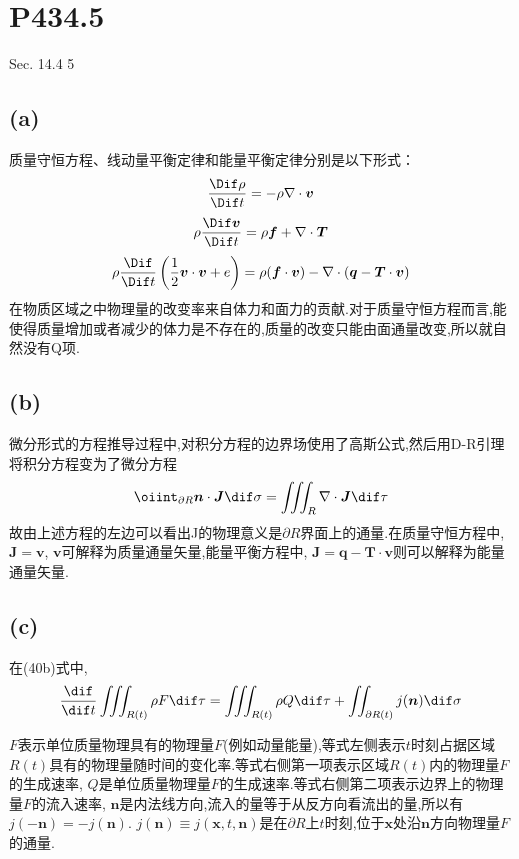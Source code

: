 \documentclass[12pt]{article}
\begin{document}
\section{P434.5}

Sec. 14.4 5

\subsection{(a)}

质量守恒方程、线动量平衡定律和能量平衡定律分别是以下形式：
\begin{equation}
	\frac{\Dif \rho}{\Dif t} = -\rho\nabla\cdot \bm{v}
\end{equation}
\begin{equation}
	\rho\frac{\Dif \bm{v}}{\Dif t} = \rho \bm{f} + \nabla\cdot \bm{T}
\end{equation}
\begin{equation}
	\rho\frac{\Dif }{\Dif t}\left(\frac{1}{2}\bm{v}\cdot \bm{v}+e\right) = \rho(\bm{f}\cdot \bm{v})-\nabla\cdot(\bm{q}-\bm{T}\cdot \bm{v})
\end{equation}
在物质区域之中物理量的改变率来自体力和面力的贡献.对于质量守恒方程而言,能使得质量增加或者减少的体力是不存在的,质量的改变只能由面通量改变,所以就自然没有Q项.

\subsection{(b)}

微分形式的方程推导过程中,对积分方程的边界场使用了高斯公式,然后用D-R引理将积分方程变为了微分方程
\begin{equation}
	\oiint_{\partial R}\bm{n}\cdot \bm{J} \dif \sigma = \iiint_{R}\nabla\cdot \bm{J}\dif \tau
\end{equation}
故由上述方程的左边可以看出J的物理意义是$\partial R$界面上的通量.在质量守恒方程中, $\bm{J}=\bm{v}$, $\bm{v}$可解释为质量通量矢量,能量平衡方程中, $\bm{J} = \bm{q}-\bm{T}\cdot \bm{v}$则可以解释为能量通量矢量.

\subsection{(c)}

在(40b)式中,
\begin{equation}
	\frac{\dif }{\dif t}\iiint_{R(t)}\rho F\dif \tau = 
\iiint_{R(t)}\rho Q\dif \tau + \iint_{\partial R(t)}j(\bm{n}) \dif \sigma
\end{equation}

$F$表示单位质量物理具有的物理量$F$(例如动量能量),等式左侧表示$t$时刻占据区域$R(t)$具有的物理量随时间的变化率.等式右侧第一项表示区域$R(t)$内的物理量$F$的生成速率, $Q$是单位质量物理量$F$的生成速率.等式右侧第二项表示边界上的物理量$F$的流入速率, $\bm{n}$是内法线方向,流入的量等于从反方向看流出的量,所以有$j(-\bm{n})=-j(\bm{n})$. $j(\bm{n})\equiv j(\bm{x},t,\bm{n})$是在$\partial R$上$t$时刻,位于$\bm{x}$处沿$\bm{n}$方向物理量$F$的通量.

\nocite{*}


\end{document}
